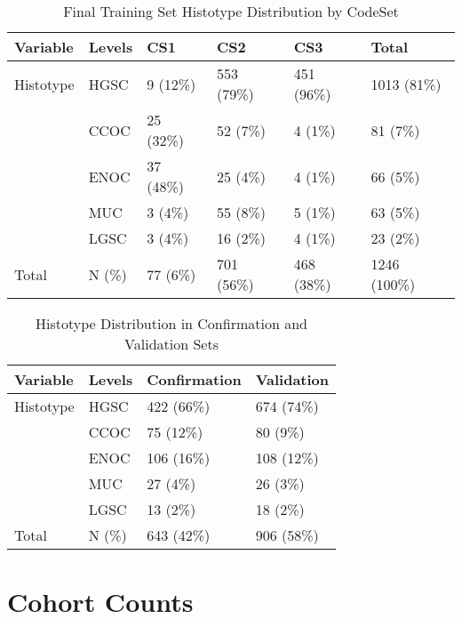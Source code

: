 \documentclass[
]{report}
\begin{document}
\begin{table}

\caption{\label{tab:train-hist-codeset}Final Training Set Histotype Distribution by CodeSet}
\centering
\begin{tabular}[t]{l|l|l|l|l|l}
\hline
Variable & Levels & CS1 & CS2 & CS3 & Total\\
\hline
Histotype & HGSC & 9 (12\%) & 553 (79\%) & 451 (96\%) & 1013 (81\%)\\
\hline
 & CCOC & 25 (32\%) & 52 (7\%) & 4 (1\%) & 81 (7\%)\\
\hline
 & ENOC & 37 (48\%) & 25 (4\%) & 4 (1\%) & 66 (5\%)\\
\hline
 & MUC & 3 (4\%) & 55 (8\%) & 5 (1\%) & 63 (5\%)\\
\hline
 & LGSC & 3 (4\%) & 16 (2\%) & 4 (1\%) & 23 (2\%)\\
\hline
Total & N (\%) & 77 (6\%) & 701 (56\%) & 468 (38\%) & 1246 (100\%)\\
\hline
\end{tabular}
\end{table}

\begin{table}

\caption{\label{tab:hist-conf-val}Histotype Distribution in Confirmation and Validation Sets}
\centering
\begin{tabular}[t]{l|l|l|l}
\hline
Variable & Levels & Confirmation & Validation\\
\hline
Histotype & HGSC & 422 (66\%) & 674 (74\%)\\
\hline
 & CCOC & 75 (12\%) & 80 (9\%)\\
\hline
 & ENOC & 106 (16\%) & 108 (12\%)\\
\hline
 & MUC & 27 (4\%) & 26 (3\%)\\
\hline
 & LGSC & 13 (2\%) & 18 (2\%)\\
\hline
Total & N (\%) & 643 (42\%) & 906 (58\%)\\
\hline
\end{tabular}
\end{table}

\hypertarget{cohort-counts}{%
\section{Cohort Counts}\label{cohort-counts}}
\end{document}
